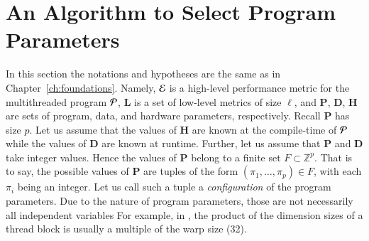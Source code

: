 \section{An Algorithm to Select Program Parameters}
\label{sec:steps}

In this section the notations and hypotheses are the same as in
Chapter~\ref{ch:foundations}.
Namely, ${\cal E}$ is a high-level performance metric for the 
multithreaded program ${\cal P}$, 
${\bm L}$ is a set of low-level metrics of size $\ell$,
and ${\bm P}$, ${\bm D}$, ${\bm H}$ are
sets of program, data, and hardware parameters, respectively. 
Recall ${\bm P}$ has size $p$.
Let us assume that the values of ${\bm H}$ are known at the compile-time of ${\cal P}$
while the values of ${\bm D}$ are known at runtime.
Further, let us assume that ${\bm P}$ and ${\bm D}$
take integer values. 
Hence the values of ${\bm P}$ belong to a finite set $F \subset \mathbb{Z}^p$.
%
%
That is to say, the possible values of
$\bm{P}$ are tuples of the form $(\pi_1, \ldots, \pi_p) \in F$,
with each $\pi_i$ being an integer.
Let us call such a tuple a \textit{configuration} of the program parameters.
Due to the nature of program parameters, those are not necessarily all
independent variables 
For example, in {\cuda}, the product of the dimension sizes
of a thread block is usually
a multiple of the warp size (32).

